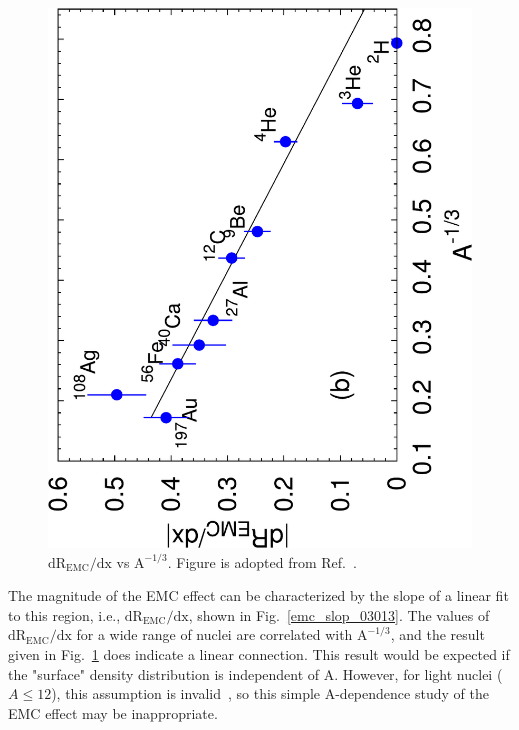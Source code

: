 \begin{figure}[!ht]
  \begin{center}
    \includegraphics[type=pdf,ext=.pdf,read=.pdf,angle=270,width=0.54\linewidth]{./figures/physics/emc_vs_a_third}
   \caption[$\mathrm{dR_{EMC}/dx}$ vs $\mathrm{A^{-1/3}}$]{\footnotesize{$\mathrm{dR_{EMC}/dx}$ vs $\mathrm{A^{-1/3}}$. Figure is adopted from Ref.~\cite{john_src_emc}.}}
    \label{emc_vs_a}
  \end{center}
\end{figure}   
  The magnitude of the EMC effect can be characterized by the slope of a linear fit to this region, i.e., $\mathrm{dR_{EMC}/dx}$, shown in Fig.~\ref{emc_slop_03013}. The values of $\mathrm{dR_{EMC}/dx}$ for a wide range of nuclei are correlated with $\mathrm{A^{-1/3}}$, and the result given in Fig.~\ref{emc_vs_a} does indicate a linear connection. This result would be expected if the "surface" density distribution is independent of A. However, for light nuclei ($A\leq 12$), this assumption is invalid~\cite{john_src_emc}, so this simple A-dependence study of the EMC effect may be inappropriate. 

